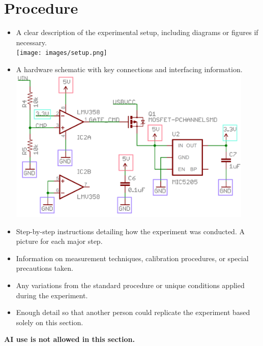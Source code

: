 \documentclass[11pt,a4paper]{article}
\begin{document}
    \section{Procedure}
        \begin{itemize}
            \item A clear description of the experimental setup, including diagrams or figures if necessary.\\
            \texttt{[image: images/setup.png]}
        
            \item A hardware schematic with key connections and interfacing information.\\
            \includegraphics[width=0.92\textwidth]{images/circuit.png}
        
            \item Step-by-step instructions detailing how the experiment was conducted. A picture for each major step.
            \item Information on measurement techniques, calibration procedures, or special precautions taken.
            \item Any variations from the standard procedure or unique conditions applied during the experiment.
            \item Enough detail so that another person could replicate the experiment based solely on this section.
        \end{itemize}
        \noindent \textbf{AI use is not allowed in this section.} 
        
\end{document}
